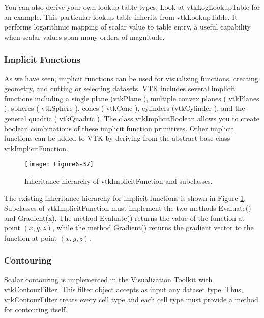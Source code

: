 You can also derive your own lookup table types. Look at vtkLogLookupTable for an example. This particular lookup table inherits from vtkLookupTable. It performs logarithmic mapping of scalar value to table entry, a useful capability when scalar values span many orders of magnitude.

\subsubsection{Implicit Functions}

As we have seen, implicit functions can be used for visualizing functions, creating geometry, and cutting or selecting datasets. VTK includes several implicit functions including a single plane (vtkPlane ), multiple convex planes ( vtkPlanes ), spheres ( vtkSphere ), cones ( vtkCone ), cylinders (vtkCylinder ), and the general quadric ( vtkQuadric ). The class vtkImplicitBoolean allows you to create boolean combinations of these implicit function primitives. Other implicit functions can be added to VTK by deriving from the abstract base class vtkImplicitFunction.

\begin{figure}[htb]
	\texttt{[image: Figure6-37]}
	\caption{Inheritance hierarchy of vtkImplicitFunction and subclasses.}\label{fig:Figure6-37}
\end{figure}

The existing inheritance hierarchy for implicit functions is shown in Figure \ref{fig:Figure6-37}. Subclasses of vtkImplicitFunction must implement the two methods Evaluate() and Gradient(x). The method Evaluate() returns the value of the function at point $(x,y,z)$, while the method Gradient() returns the gradient vector to the function at point $(x,y,z)$.

\subsubsection{Contouring}

Scalar contouring is implemented in the Visualization Toolkit with vtkContourFilter. This filter object accepts as input any dataset type. Thus, vtkContourFilter treats every cell type and each cell type must provide a method for contouring itself.

